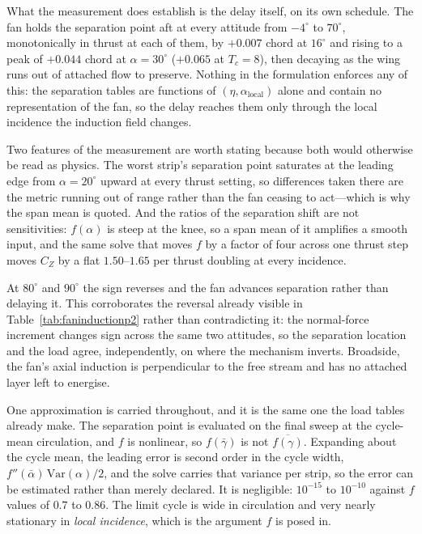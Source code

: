 \documentclass[submit]{aiaa-tc}
\begin{document}
What the measurement does establish is the delay itself, on its own
schedule. The fan holds the separation point aft at every attitude from
$-4^\circ$ to $70^\circ$, monotonically in thrust at each of them, by
$+0.007$ chord at $16^\circ$ and rising to a peak of $+0.044$ chord at
$\alpha = 30^\circ$ ($+0.065$ at $T_c = 8$), then decaying as the wing
runs out of attached flow to preserve. Nothing in the formulation
enforces any of this: the separation tables are functions of $(\eta,
\alpha_{\text{local}})$ alone and contain no representation of the fan,
so the delay reaches them only through the local incidence the induction
field changes.

Two features of the measurement are worth stating because both would
otherwise be read as physics. The worst strip's separation point
saturates at the leading edge from $\alpha = 20^\circ$ upward at every
thrust setting, so differences taken there are the metric running out of
range rather than the fan ceasing to act---which is why the span mean is
quoted. And the ratios of the separation shift are not sensitivities:
$f(\alpha)$ is steep at the knee, so a span mean of it amplifies a smooth
input, and the same solve that moves $f$ by a factor of four across one
thrust step moves $C_Z$ by a flat $1.50$--$1.65$ per thrust doubling at
every incidence.

At $80^\circ$ and $90^\circ$ the sign reverses and the fan advances
separation rather than delaying it. This corroborates the reversal
already visible in Table~\ref{tab:faninductionp2} rather than
contradicting it: the normal-force increment changes sign across the same
two attitudes, so the separation location and the load agree,
independently, on where the mechanism inverts. Broadside, the fan's axial
induction is perpendicular to the free stream and has no attached layer
left to energise.

One approximation is carried throughout, and it is the same one the load
tables already make. The separation point is evaluated on the final sweep
at the cycle-mean circulation, and $f$ is nonlinear, so $f(\bar{\gamma})$
is not $\overline{f(\gamma)}$. Expanding about the cycle mean, the leading
error is second order in the cycle width, $f''(\bar\alpha)\,
\mathrm{Var}(\alpha)/2$, and the solve carries that variance per strip, so
the error can be estimated rather than merely declared. It is negligible:
$10^{-15}$ to $10^{-10}$ against $f$ values of $0.7$ to $0.86$. The limit
cycle is wide in circulation and very nearly stationary in \emph{local
incidence}, which is the argument $f$ is posed in.
\end{document}
